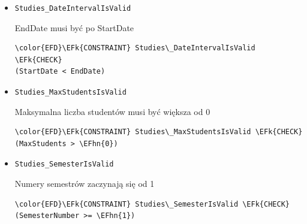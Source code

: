 \documentclass[11pt]{article}
\newcommand{\EFk}[1]{\textcolor{EFk}{\textbf{#1}}} %
\newcommand{\EFhn}[1]{\textcolor{EFhn}{#1}} %
\begin{document}
\begin{itemize}
\item \texttt{Studies\_DateIntervalIsValid}

EndDate musi być po StartDate
\begin{Code}
\begin{Verbatim}
\color{EFD}\EFk{CONSTRAINT} Studies\_DateIntervalIsValid \EFk{CHECK}
(StartDate < EndDate)
\end{Verbatim}
\end{Code}
\item \texttt{Studies\_MaxStudentsIsValid}

Maksymalna liczba studentów musi być większa od 0
\begin{Code}
\begin{Verbatim}
\color{EFD}\EFk{CONSTRAINT} Studies\_MaxStudentsIsValid \EFk{CHECK}
(MaxStudents > \EFhn{0})
\end{Verbatim}
\end{Code}
\item \texttt{Studies\_SemesterIsValid}

Numery semestrów zaczynają się od 1
\begin{Code}
\begin{Verbatim}
\color{EFD}\EFk{CONSTRAINT} Studies\_SemesterIsValid \EFk{CHECK}
(SemesterNumber >= \EFhn{1})
\end{Verbatim}
\end{Code}
\end{itemize}
\end{document}
